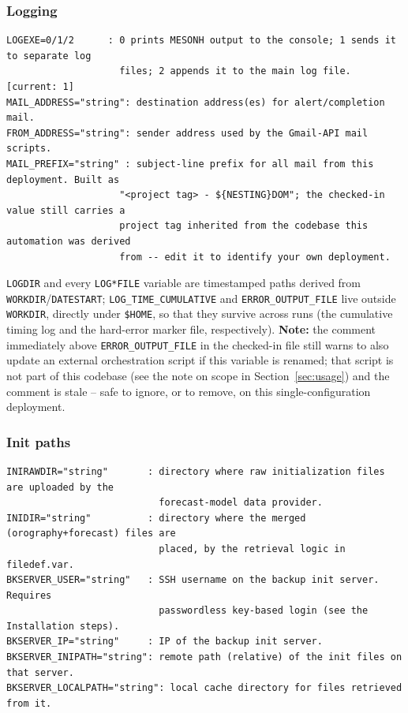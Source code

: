 \subsubsection{Logging}
\begin{lstlisting}
LOGEXE=0/1/2      : 0 prints MESONH output to the console; 1 sends it to separate log
                    files; 2 appends it to the main log file. [current: 1]
MAIL_ADDRESS="string": destination address(es) for alert/completion mail.
FROM_ADDRESS="string": sender address used by the Gmail-API mail scripts.
MAIL_PREFIX="string" : subject-line prefix for all mail from this deployment. Built as
                    "<project tag> - ${NESTING}DOM"; the checked-in value still carries a
                    project tag inherited from the codebase this automation was derived
                    from -- edit it to identify your own deployment.
\end{lstlisting}
\texttt{LOGDIR} and every \texttt{LOG*FILE} variable are timestamped paths derived from
\texttt{WORKDIR}/\texttt{DATESTART}; \texttt{LOG\_TIME\_CUMULATIVE} and \texttt{ERROR\_OUTPUT\_FILE}
live outside \texttt{WORKDIR}, directly under \texttt{\$HOME}, so that they survive across runs (the
cumulative timing log and the hard-error marker file, respectively). \textbf{Note:} the comment
immediately above \texttt{ERROR\_OUTPUT\_FILE} in the checked-in file still warns to also update an
external orchestration script if this variable is renamed; that script is not part of this codebase (see
the note on scope in Section~\ref{sec:usage}) and the comment is stale -- safe to ignore, or to remove,
on this single-configuration deployment.

\subsubsection{Init paths}
\begin{lstlisting}
INIRAWDIR="string"       : directory where raw initialization files are uploaded by the
                           forecast-model data provider.
INIDIR="string"          : directory where the merged (orography+forecast) files are
                           placed, by the retrieval logic in filedef.var.
BKSERVER_USER="string"   : SSH username on the backup init server. Requires
                           passwordless key-based login (see the Installation steps).
BKSERVER_IP="string"     : IP of the backup init server.
BKSERVER_INIPATH="string": remote path (relative) of the init files on that server.
BKSERVER_LOCALPATH="string": local cache directory for files retrieved from it.
\end{lstlisting}

